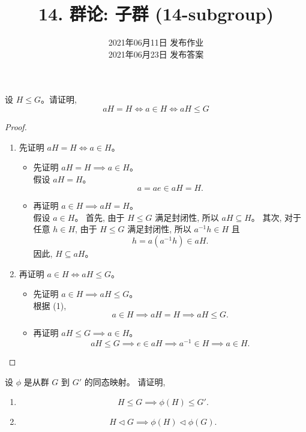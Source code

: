 \documentclass[a4paper, justified]{tufte-handout}
\title{14. 群论: 子群 (14-subgroup)}
\date{2021年06月11日 发布作业 \\ 2021年06月23日 发布答案}
\begin{document}
\maketitle
\noplagiarism %
\begin{abstract}
\end{abstract}
\beginrequired

\begin{problem}
  设 $H \le G$。请证明,
  \[
    aH = H \iff a \in H \iff aH \le G
  \]
\end{problem}

\begin{proof}
  \begin{enumerate}[(1)]
    \item 先证明 $aH = H \iff a \in H$。
      \begin{itemize}
        \item 先证明 $aH = H \implies a \in H$。\\
          假设 $aH = H$。
          \[
            a = ae \in aH = H.
          \]
        \item 再证明 $a \in H \implies aH = H$。\\
          假设 $a \in H$。
          首先, 由于 $H \le G$ 满足封闭性, 所以 $aH \subseteq H$。
          其次, 对于任意 $h \in H$, 由于 $H \le G$ 满足封闭性,
          所以 $a^{-1}h \in H$ 且
          \[
            h = a (a^{-1}h) \in aH.
          \]
          因此, $H \subseteq aH$。
      \end{itemize}
    \item 再证明 $a \in H \iff aH \le G$。\\
      \begin{itemize}
        \item 先证明 $a \in H \implies aH \le G$。\\
          根据 (1),
          \[
            a \in H \implies aH = H \implies aH \le G.
          \]
        \item 再证明 $aH \le G \implies a \in H$。
          \[
            aH \le G \implies e \in aH \implies a^{-1} \in H \implies a \in H.
          \]
      \end{itemize}
  \end{enumerate}
\end{proof}

\begin{problem}[\score{5 = 2 + 3} $\star\star\star$]
  设 $\phi$ 是从群 $G$ 到 $G'$ 的同态映射。
  请证明,
  \begin{enumerate}[(1)]
    \item
      \[
        H \le G \implies \phi(H) \le G'.
      \]
    \item
      \[
        H \triangleleft G \implies \phi(H) \triangleleft \phi(G).
      \]
  \end{enumerate}
\end{problem}
\end{document}
